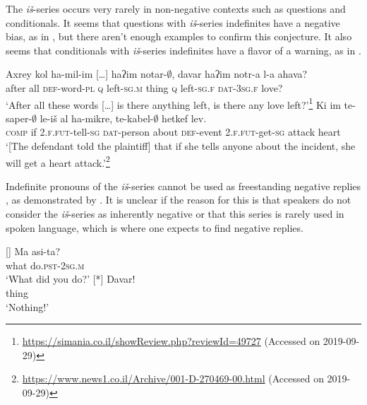 \documentclass[output=paper,colorlinks,citecolor=brown]{langscibook}
\begin{document}
The \textit{iš}{}-series occurs very rarely in non-negative contexts such as questions and conditionals. It seems that questions with \textit{iš}{}-series indefinites have a negative bias, as in , but there aren’t enough examples to confirm this conjecture. It also seems that conditionals with \textit{iš}{}-series indefinites have a flavor of a warning, as in .

\ea\label{ex:heb:27}
    \ea\label{ex:heb:27a} 
        \gll Axrey kol ha-mil-im […] haʔim notar-${\emptyset}$, davar haʔim notr-a l-a ahava?\\
         after all \textsc{def}{}-word-\textsc{pl} {} \textsc{q} left-\textsc{sg.m} thing \textsc{q} left-\textsc{sg.f} \textsc{dat}{}-3\textsc{sg.f} love?\\
        \glt ‘After all these words […] is there anything left, is there any love left?’\footnote{\url{https://simania.co.il/showReview.php?reviewId=49727} (Accessed on 2019-09-29)}
    \ex\label{ex:heb:27b}
        \gll Ki im te-saper-${\emptyset}$ le-iš al ha-mikre, te-kabel-${\emptyset}$ hetkef lev. \\
            \textsc{comp} if \textsc{2.f.fut}{}-tell-\textsc{sg} \textsc{dat}{}-person about \textsc{def}{}-event \textsc{2.f.fut}{}-get{}-\textsc{sg} attack heart \\
        \glt ‘[The defendant told the plaintiff] that if she tells anyone about the incident, she will get a heart attack.'\footnote{\url{https://www.news1.co.il/Archive/001-D-270469-00.html} (Accessed on 2019-09-29)}
    \z 
\z 

Indefinite pronouns of the \textit{iš}{}-series cannot be used as freestanding negative replies \citep[135, 139]{Tzivoni1993}, as demonstrated by . It is unclear if the reason for this is that speakers do not consider the \textit{iš}{}-series as inherently negative or that this series is rarely used in spoken language, which is where one expects to find negative replies.

\ea\label{ex:heb:28} 
    \begin{xlist}[A: ]
    []{\label{ex:heb:28A}
        \gll  Ma asi-ta?\\ 
              what do.\textsc{pst-2sg.m}\\ 
        \glt ‘What did you do?'}
    [*]{\label{ex:heb:28B}
        \gll  Davar!\\ 
              thing\\
        \glt ‘Nothing!’}
    \end{xlist}
\z 
\end{document}
